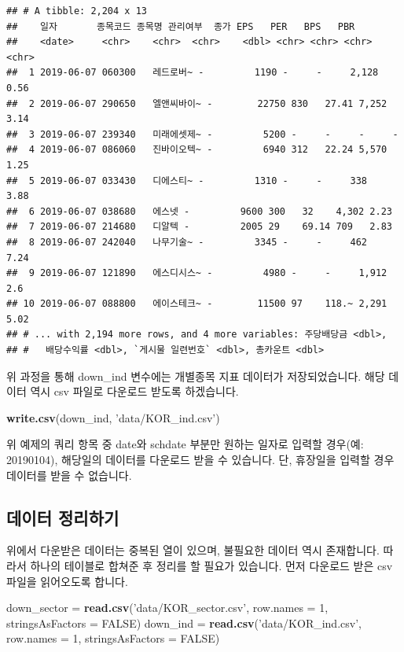\documentclass[]{book}
\newenvironment{Shaded}{\begin{snugshade}}{\end{snugshade}}
\newcommand{\DataTypeTok}[1]{\textcolor[rgb]{0.13,0.29,0.53}{#1}}
\newcommand{\DecValTok}[1]{\textcolor[rgb]{0.00,0.00,0.81}{#1}}
\newcommand{\KeywordTok}[1]{\textcolor[rgb]{0.13,0.29,0.53}{\textbf{#1}}}
\newcommand{\NormalTok}[1]{#1}
\newcommand{\OtherTok}[1]{\textcolor[rgb]{0.56,0.35,0.01}{#1}}
\newcommand{\StringTok}[1]{\textcolor[rgb]{0.31,0.60,0.02}{#1}}
\begin{document}
\begin{verbatim}
## # A tibble: 2,204 x 13
##    일자       종목코드 종목명 관리여부  종가 EPS   PER   BPS   PBR  
##    <date>     <chr>    <chr>  <chr>    <dbl> <chr> <chr> <chr> <chr>
##  1 2019-06-07 060300   레드로버~ -         1190 -     -     2,128 0.56 
##  2 2019-06-07 290650   엘앤씨바이~ -        22750 830   27.41 7,252 3.14 
##  3 2019-06-07 239340   미래에셋제~ -         5200 -     -     -     -    
##  4 2019-06-07 086060   진바이오텍~ -         6940 312   22.24 5,570 1.25 
##  5 2019-06-07 033430   디에스티~ -         1310 -     -     338   3.88 
##  6 2019-06-07 038680   에스넷 -         9600 300   32    4,302 2.23 
##  7 2019-06-07 214680   디알텍 -         2005 29    69.14 709   2.83 
##  8 2019-06-07 242040   나무기술~ -         3345 -     -     462   7.24 
##  9 2019-06-07 121890   에스디시스~ -         4980 -     -     1,912 2.6  
## 10 2019-06-07 088800   에이스테크~ -        11500 97    118.~ 2,291 5.02 
## # ... with 2,194 more rows, and 4 more variables: 주당배당금 <dbl>,
## #   배당수익률 <dbl>, `게시물 일련번호` <dbl>, 총카운트 <dbl>
\end{verbatim}

위 과정을 통해 down\_ind 변수에는 개별종목 지표 데이터가 저장되었습니다. 해당 데이터 역시 csv 파일로 다운로드 받도록 하겠습니다.

\begin{Shaded}
\begin{Highlighting}[]
\KeywordTok{write.csv}\NormalTok{(down_ind, }\StringTok{'data/KOR_ind.csv'}\NormalTok{)}
\end{Highlighting}
\end{Shaded}

위 예제의 쿼리 항목 중 date와 schdate 부분만 원하는 일자로 입력할 경우(예: 20190104), 해당일의 데이터를 다운로드 받을 수 있습니다. 단, 휴장일을 입력할 경우 데이터를 받을 수 없습니다.

\hypertarget{section-21}{%
\subsection{데이터 정리하기}\label{section-21}}

위에서 다운받은 데이터는 중복된 열이 있으며, 불필요한 데이터 역시 존재합니다. 따라서 하나의 테이블로 합쳐준 후 정리를 할 필요가 있습니다. 먼저 다운로드 받은 csv 파일을 읽어오도록 합니다.

\begin{Shaded}
\begin{Highlighting}[]
\NormalTok{down_sector =}\StringTok{ }\KeywordTok{read.csv}\NormalTok{(}\StringTok{'data/KOR_sector.csv'}\NormalTok{, }\DataTypeTok{row.names =} \DecValTok{1}\NormalTok{, }\DataTypeTok{stringsAsFactors =} \OtherTok{FALSE}\NormalTok{)}
\NormalTok{down_ind =}\StringTok{ }\KeywordTok{read.csv}\NormalTok{(}\StringTok{'data/KOR_ind.csv'}\NormalTok{,  }\DataTypeTok{row.names =} \DecValTok{1}\NormalTok{, }\DataTypeTok{stringsAsFactors =} \OtherTok{FALSE}\NormalTok{)}
\end{Highlighting}
\end{Shaded}
\end{document}
